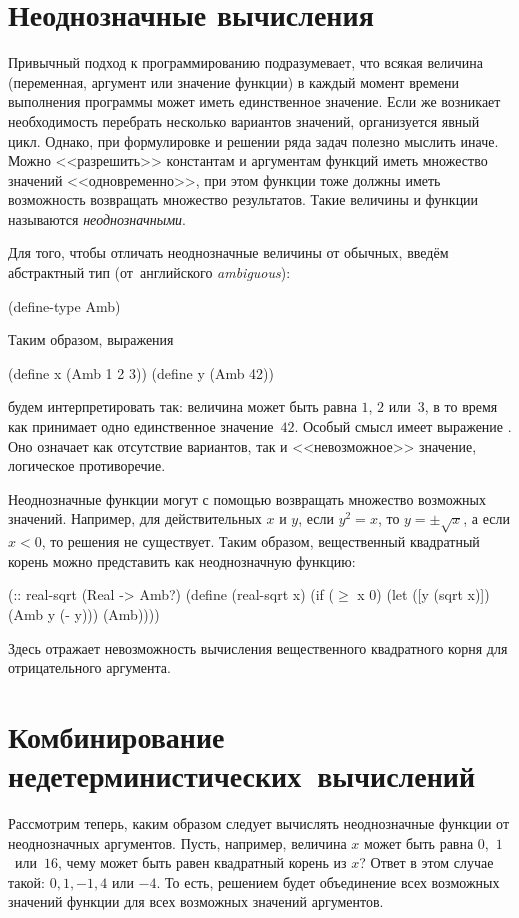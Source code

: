 
\section{Неоднозначные вычисления}%
Привычный подход к программированию подразумевает, что всякая величина (переменная, аргумент или значение функции) в каждый момент времени выполнения программы может иметь единственное значение. Если же возникает необходимость перебрать несколько вариантов значений, организуется явный цикл.
Однако, при формулировке и решении ряда задач полезно мыслить иначе. Можно <<разрешить>> константам и аргументам функций иметь множество значений <<одновременно>>, при этом функции тоже должны иметь возможность возвращать множество результатов. Такие величины и функции называются \emph{неоднозначными}.

Для того, чтобы отличать неоднозначные величины от обычных, введём абстрактный тип  (от~английского \emph{ambiguous}):
\begin{SchemeCode}
(define-type Amb)
\end{SchemeCode}
Таким образом, выражения
\begin{SchemeCode}
(define x (Amb 1 2 3))
(define y (Amb 42))
\end{SchemeCode}
будем интерпретировать так: величина  может быть равна $1$, $2$ или~$3$, в то время как  принимает одно единственное значение~$42$. Особый смысл имеет выражение . Оно означает как отсутствие вариантов, так и <<невозможное>> значение, логическое противоречие.

Неоднозначные функции могут с помощью  возвращать множество возможных значений. Например, для действительных $x$ и $y$, если $y^2 = x$, то $y = \pm\sqrt{x}$, а если $x<0$, то решения не существует. Таким образом, вещественный квадратный корень можно представить как неоднозначную функцию:
\label{real-sqrt}%
\begin{SchemeCode}
(:: real-sqrt (Real -> Amb?)
  (define (real-sqrt x)
    (if ($\ge$ x 0) 
        (let ([y (sqrt x)]) (Amb y (- y)))
        (Amb))))
\end{SchemeCode}
Здесь  отражает невозможность вычисления вещественного квадратного корня для отрицательного аргумента.

\section[4]{Комбинирование недетерминистических~вычислений}%
Рассмотрим теперь, каким образом следует вычислять неоднозначные функции от неоднозначных аргументов. Пусть, например, величина $x$ может быть равна \mbox{$0$, $1$ или $16$}, чему может быть равен квадратный корень из $x$? Ответ в этом случае такой: $0, 1, -1, 4$ или $-4$. То есть, решением будет объединение всех возможных значений функции для всех возможных значений аргументов.

